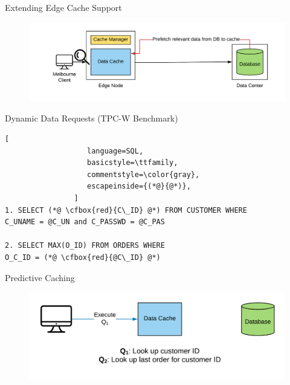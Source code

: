 \documentclass[10pt]{beamer}
\newcommand{\cfbox}[2]{%
    \colorlet{currentcolor}{.}%
    {\color{#1}%
    \fbox{\color{currentcolor}#2}}%
}
\begin{document}
\begin{frame}{Extending Edge Cache Support}
    \begin{figure}
        \center
        \hspace*{-1.5cm}
        \includegraphics[scale=0.17]{apollo_ec_dbl_learn}
    \end{figure}
\end{frame}

\begin{frame}[fragile]{Dynamic Data Requests (TPC-W Benchmark)}
    \begin{lstlisting}[
                   language=SQL,
                   basicstyle=\ttfamily,
                   commentstyle=\color{gray},
                   escapeinside={(*@}{@*)},
                ]
1. SELECT (*@ \cfbox{red}{C\_ID} @*) FROM CUSTOMER WHERE 
C_UNAME = @C_UN and C_PASSWD = @C_PAS

2. SELECT MAX(O_ID) FROM ORDERS WHERE
O_C_ID = (*@ \cfbox{red}{@C\_ID} @*)
    \end{lstlisting}

\begin{center}
\end{center}
\end{frame}

\begin{frame}{Predictive Caching}
    \begin{figure}
        \center
        \includegraphics[scale=0.17]{apollo_predictive_execution}
    \end{figure}
\end{frame}
\end{document}
